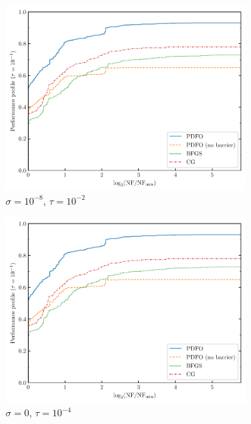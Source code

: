 \documentclass[
    smallextended,  %
    final,        %
]{svjour3}
\begin{document}
\begin{figure}[htbp]
    \hfill
    \begin{subfigure}{.32\textwidth}
        \centering
        \includegraphics[width=\textwidth,page=1]{perf-nan-bfgs_cg_pdfo-50-10-0.01.pdf}
        \caption{$\sigma = 10^{-8}$, $\tau = 10^{-2}$}
    \end{subfigure}
    \begin{subfigure}{.32\textwidth}
        \centering
        \includegraphics[width=\textwidth,page=1]{perf-nan-bfgs_cg_pdfo-50-10-0.01.pdf}
        \caption{$\sigma = 0$, $\tau = 10^{-4}$}
    \end{subfigure}
    \hfill
    \begin{subfigure}{.32\textwidth}

\end{subfigure}
\end{figure}
\end{document}
